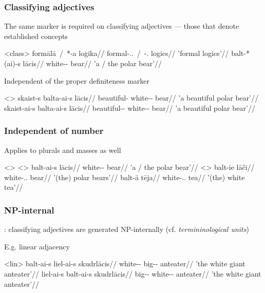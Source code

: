 \documentclass[9pt, t]{beamer}
\begin{document}
\begin{frame}
    \frametitle{Classifying adjectives}

    The same marker is required on classifying adjectives --- those that denote established concepts

    \pex<class>
        \a \begingl
            \gla formālā\ /\ *-a loģika//
            \glb formal-\Def{}.\F.\Nom{}\ /\ -\F.\Nom{} logics//
            \glft 'formal logics'//
        \endgl
        \a \begingl
            \gla balt-*(ai)-s lācis//
            \glb white-\Def{}-\Nom{} bear//
            \glft 'a / the polar bear'//
        \endgl
    \xe
    
    \pause
    Independent of the proper definiteness marker
    
    \pex<>
        \a \begingl
            \gla skaist-s balta-ai-s lācis//
            \glb beautiful-\Nom{} white-\Def{}-\Nom{} bear//
            \glft 'a beautiful polar bear'//
        \endgl
        \a \begingl
            \gla skaist-ai-s balta-ai-s lācis//
            \glb beautiful-\Def-\Nom{} white-\Def{}-\Nom{} bear//
            \glft 'a beautiful polar bear'//
        \endgl
    \xe

\end{frame}

\begin{frame}
    \frametitle{Independent of number}

    Applies to plurals and masses as well

    \pex<>
        \a<> \begingl
            \gla balt-ai-s lācis//
            \glb white-\Def{}-\Nom{} bear//
            \glft 'a / the polar bear'//
        \endgl
        \a<> \begingl
            \gla balt-ie lāči//
            \glb white-\Def{}.\Pl.\Nom{} bear//
            \glft '(the) polar bears'//
        \endgl
        \a \begingl
            \gla balt-ā tēja//
            \glb white-\Def.\F.\Nom{} tea//
            \glft '(the) white tea'//
        \endgl
    \xe

\end{frame}

\begin{frame}
    \frametitle{NP-internal}

    \citep[etc.]{rutpro2006}: classifying adjectives are generated NP-internally (cf. \textit{termininological units})

    E.g. linear adjacency

    \pex<lin>
        \a \begingl
            \gla balt-ai-s liel-ai-s skudrlācis//
            \glb white-\Def{}-\Nom{} big-\Def-\Nom{} anteater//
            \glft 'the white giant anteater'//
        \endgl
        \a \begingl
            \gla\ljudge{\#}liel-ai-s balt-ai-s skudrlācis//
            \glb big-\Def-\Nom{} white-\Def{}-\Nom{} anteater//
            \glft 'the white giant anteater'//
        \endgl
    \xe

\end{frame}
\end{document}
